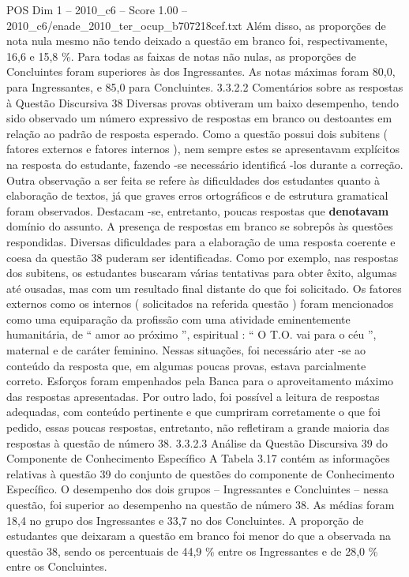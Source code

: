 \begin{textsample}{POS Dim 1 – 2010\_c6 – Score 1.00 – 2010\_c6/enade\_2010\_ter\_ocup\_b707218cef.txt}
Além disso, as proporções de nota nula mesmo não tendo deixado a questão em branco foi, respectivamente, 16,6 e 15,8 \%.
Para todas as faixas de notas não nulas, as proporções de Concluintes foram superiores às dos Ingressantes.
As notas máximas foram 80,0, para Ingressantes, e 85,0 para Concluintes. 3.3.2.2 Comentários sobre as respostas à Questão Discursiva 38 Diversas provas obtiveram um baixo desempenho, tendo sido observado um número expressivo de respostas em branco ou destoantes em relação ao padrão de resposta esperado.
Como a questão possui dois subitens ( fatores externos e fatores internos ), nem sempre estes se apresentavam explícitos na resposta do estudante, fazendo -se necessário identificá -los durante a correção.
Outra observação a ser feita se refere às dificuldades dos estudantes quanto à elaboração de textos, já que graves erros ortográficos e de estrutura gramatical foram observados.
Destacam -se, entretanto, poucas respostas que \textbf{denotavam} domínio do assunto.
A presença de respostas em branco se sobrepôs às questões respondidas.
Diversas dificuldades para a elaboração de uma resposta coerente e coesa da questão 38 puderam ser identificadas.
Como por exemplo, nas respostas dos subitens, os estudantes buscaram várias tentativas para obter êxito, algumas até ousadas, mas com um resultado final distante do que foi solicitado.
Os fatores externos como os internos ( solicitados na referida questão ) foram mencionados como uma equiparação da profissão com uma atividade eminentemente humanitária, de “ amor ao próximo ”, espiritual : “ O T.O. vai para o céu ”, maternal e de caráter feminino.
Nessas situações, foi necessário ater -se ao conteúdo da resposta que, em algumas poucas provas, estava parcialmente correto.
Esforços foram empenhados pela Banca para o aproveitamento máximo das respostas apresentadas.
Por outro lado, foi possível a leitura de respostas adequadas, com conteúdo pertinente e que cumpriram corretamente o que foi pedido, essas poucas respostas, entretanto, não refletiram a grande maioria das respostas à questão de número 38. 3.3.2.3 Análise da Questão Discursiva 39 do Componente de Conhecimento Específico A Tabela 3.17 contém as informações relativas à questão 39 do conjunto de questões do componente de Conhecimento Específico.
O desempenho dos dois grupos – Ingressantes e Concluintes – nessa questão, foi superior ao desempenho na questão de número 38.
As médias foram 18,4 no grupo dos Ingressantes e 33,7 no dos Concluintes.
A proporção de estudantes que deixaram a questão em branco foi menor do que a observada na questão 38, sendo os percentuais de 44,9 \% entre os Ingressantes e de 28,0 \% entre os Concluintes.

\end{textsample}
